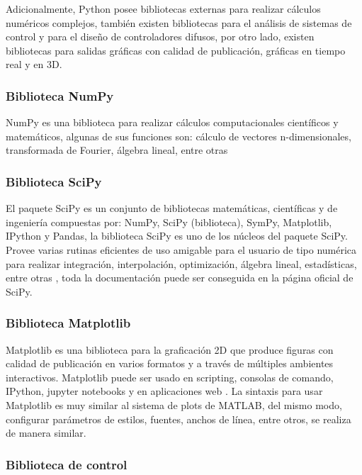         Adicionalmente, Python posee bibliotecas externas para realizar cálculos numéricos complejos, también existen bibliotecas para el análisis de sistemas de control y para el diseño de controladores difusos, por otro lado, existen bibliotecas para salidas gráficas con calidad de publicación, gráficas en tiempo real y en 3D.
        
        \subsubsection{Biblioteca NumPy}

            NumPy es una biblioteca para realizar cálculos computacionales científicos y matemáticos, algunas de sus funciones son: cálculo de vectores n-dimensionales, transformada de Fourier, álgebra lineal, entre otras \Parencite{numpy}

        \subsubsection{Biblioteca SciPy}	

            El paquete SciPy es un conjunto de bibliotecas matemáticas, científicas y de ingeniería compuestas por: NumPy, SciPy (biblioteca), SymPy, Matplotlib, IPython y Pandas, la biblioteca SciPy es uno de los núcleos del paquete SciPy. Provee varias rutinas eficientes de uso amigable para el usuario de tipo numérica para realizar integración, interpolación, optimización, álgebra lineal, estadísticas, entre otras \Parencite{scipy}, toda la documentación puede ser conseguida en la página oficial de SciPy.
            
        \subsubsection{Biblioteca Matplotlib}

            Matplotlib es una biblioteca para la graficación 2D que produce figuras con calidad de publicación en varios formatos y a través de múltiples ambientes interactivos. Matplotlib puede ser usado en scripting, consolas de comando, IPython, jupyter notebooks y en aplicaciones web \Parencite{Hunter:2007}. La sintaxis para usar Matplotlib es muy similar al sistema de plots de MATLAB, del mismo modo, configurar parámetros de estilos, fuentes, anchos de línea, entre otros, se realiza de manera similar.

        \subsubsection{Biblioteca de control}

